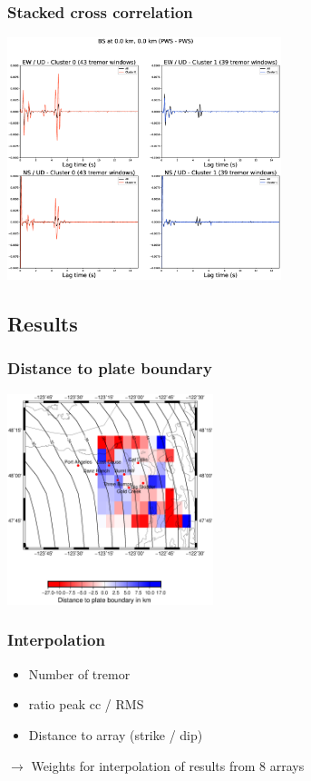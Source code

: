\documentclass{beamer}
\begin{document}
	\begin{frame}
		\frametitle{Stacked cross correlation}
		\begin{center}
			\includegraphics[width=8cm, trim={4.5cm 2.5cm 5cm 4cm}, clip]{BS_000_000/BS_000_000_PWS_PWS_cluster_stackcc.eps}
		\end{center}
	\end{frame}

	\subsection{Results}

	\begin{frame}
		\frametitle{Distance to plate boundary}
		\begin{center}
			\includegraphics[width=6cm, trim={1cm 3cm 2cm 6cm}, clip]{other/d_to_pb_PWS_PWS.eps}
		\end{center}
	\end{frame}

	\begin{frame}
		\frametitle{Interpolation}
		\begin{itemize}
			\item Number of tremor
			\item ratio peak cc / RMS
			\item Distance to array (strike / dip)
		\end{itemize}

		$\rightarrow$ Weights for interpolation of results from 8 arrays
	\end{frame}
\end{document}
